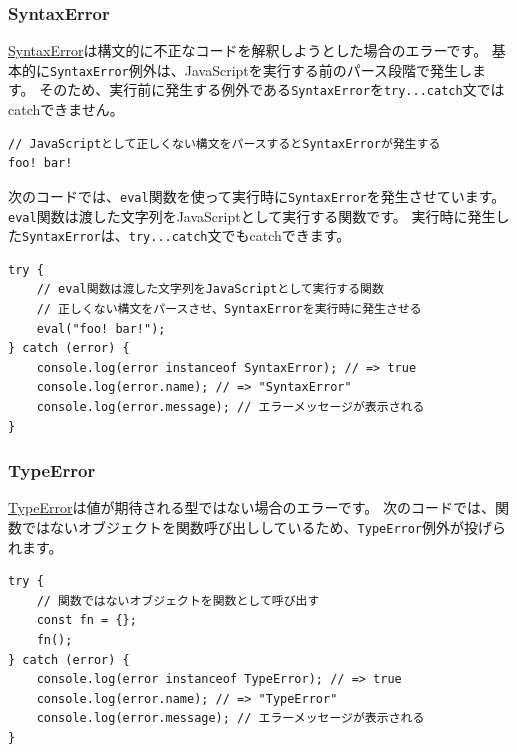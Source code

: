 \hypertarget{syntax-error}{%
\subsubsection{SyntaxError}\label{syntax-error}}

\href{https://developer.mozilla.org/ja/docs/Web/JavaScript/Reference/Global_Objects/SyntaxError}{SyntaxError}は構文的に不正なコードを解釈しようとした場合のエラーです。
基本的に\texttt{SyntaxError}例外は、JavaScriptを実行する前のパース段階で発生します。
そのため、実行前に発生する例外である\texttt{SyntaxError}を\texttt{try...catch}文ではcatchできません。

\begin{lstlisting}
// JavaScriptとして正しくない構文をパースするとSyntaxErrorが発生する
foo! bar!
\end{lstlisting}

次のコードでは、\texttt{eval}関数を使って実行時に\texttt{SyntaxError}を発生させています。
\texttt{eval}関数は渡した文字列をJavaScriptとして実行する関数です。
実行時に発生した\texttt{SyntaxError}は、\texttt{try...catch}文でもcatchできます。

\begin{lstlisting}
try {
    // eval関数は渡した文字列をJavaScriptとして実行する関数
    // 正しくない構文をパースさせ、SyntaxErrorを実行時に発生させる
    eval("foo! bar!");
} catch (error) {
    console.log(error instanceof SyntaxError); // => true
    console.log(error.name); // => "SyntaxError"
    console.log(error.message); // エラーメッセージが表示される
}
\end{lstlisting}

\hypertarget{type-error}{%
\subsubsection{TypeError}\label{type-error}}

\href{https://developer.mozilla.org/ja/docs/Web/JavaScript/Reference/Global_Objects/TypeError}{TypeError}は値が期待される型ではない場合のエラーです。
次のコードでは、関数ではないオブジェクトを関数呼び出ししているため、\texttt{TypeError}例外が投げられます。

\begin{lstlisting}
try {
    // 関数ではないオブジェクトを関数として呼び出す
    const fn = {};
    fn();
} catch (error) {
    console.log(error instanceof TypeError); // => true
    console.log(error.name); // => "TypeError"
    console.log(error.message); // エラーメッセージが表示される
}
\end{lstlisting}

